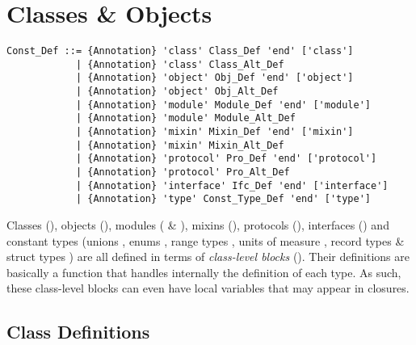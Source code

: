 
\chapter{Classes \& Objects}

\syntax\begin{lstlisting}
Const_Def ::= {Annotation} 'class' Class_Def 'end' ['class']
            | {Annotation} 'class' Class_Alt_Def
            | {Annotation} 'object' Obj_Def 'end' ['object']
            | {Annotation} 'object' Obj_Alt_Def
            | {Annotation} 'module' Module_Def 'end' ['module']
            | {Annotation} 'module' Module_Alt_Def
            | {Annotation} 'mixin' Mixin_Def 'end' ['mixin']
            | {Annotation} 'mixin' Mixin_Alt_Def
            | {Annotation} 'protocol' Pro_Def 'end' ['protocol']
            | {Annotation} 'protocol' Pro_Alt_Def
            | {Annotation} 'interface' Ifc_Def 'end' ['interface']
            | {Annotation} 'type' Const_Type_Def 'end' ['type']
\end{lstlisting}

Classes (), objects (), modules ( \& ), mixins (), protocols (), interfaces () and constant types (unions , enums , range types , units of measure , record types  \& struct types ) are all defined in terms of {\em class-level blocks} (). Their definitions are basically a function that handles internally the definition of each type. As such, these class-level blocks can even have local variables that may appear in closures. 

\section{Class Definitions}
\label{sec:class-definitions}

